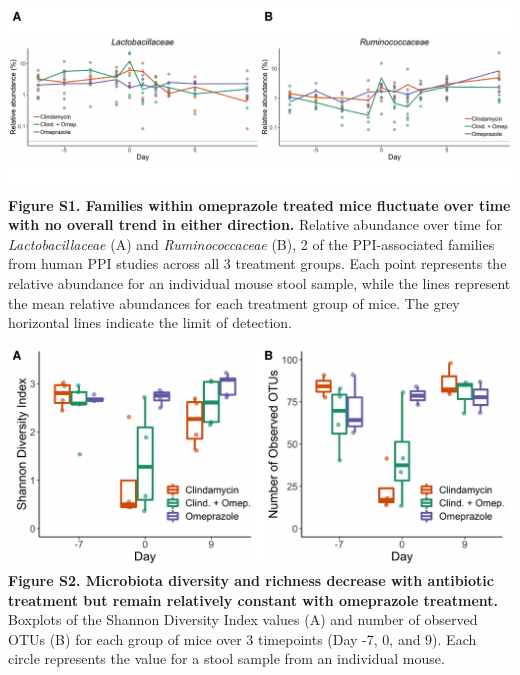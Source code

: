 \documentclass[11pt,]{article}
\begin{document}
\includegraphics{figure_s1.pdf} \textbf{Figure S1. Families within
omeprazole treated mice fluctuate over time with no overall trend in
either direction.} Relative abundance over time for
\emph{Lactobacillaceae} (A) and \emph{Ruminococcaceae} (B), 2 of the
PPI-associated families from human PPI studies across all 3 treatment
groups. Each point represents the relative abundance for an individual
mouse stool sample, while the lines represent the mean relative
abundances for each treatment group of mice. The grey horizontal lines
indicate the limit of detection.

\newpage

\includegraphics{figure_s2.pdf} \textbf{Figure S2. Microbiota diversity
and richness decrease with antibiotic treatment but remain relatively
constant with omeprazole treatment.} Boxplots of the Shannon Diversity
Index values (A) and number of observed OTUs (B) for each group of mice
over 3 timepoints (Day -7, 0, and 9). Each circle represents the value
for a stool sample from an individual mouse.
\end{document}
